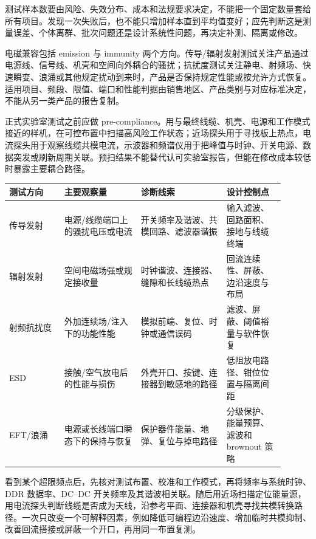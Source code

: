 测试样本数要由风险、失效分布、成本和法规要求决定，不能把一个固定数量套给所有项目。发现一次失败后，也不能只增加样本直到平均值变好；应先判断这是测量误差、个体离群、批次问题还是设计系统性问题，再决定补测、隔离或修改。


电磁兼容包括 emission 与 immunity 两个方向。传导/辐射发射测试关注产品通过电源线、信号线、机壳和空间向外耦合的骚扰；抗扰度测试关注静电、射频场、快速瞬变、浪涌或其他规定扰动到来时，产品是否保持规定性能或按允许方式恢复。适用项目、频段、限值、端口和性能判据由销售地区、产品类别与对应标准决定，不能从另一类产品的报告复制。\cite{iec-emc}

正式实验室测试之前应做 pre-compliance。用与最终线缆、机壳、电源和工作模式接近的样机，在可控布置中扫描高风险工作状态；近场探头用于寻找板上热点，电流探头用于观察线缆共模电流，示波器和频谱仪用于把峰值与时钟、开关电源、数据突发或刷新周期关联。预扫结果不能替代认可实验室报告，但能在修改成本较低时暴露主要耦合路径。

\begin{longtable}{L{0.18\linewidth}L{0.25\linewidth}L{0.28\linewidth}L{0.19\linewidth}}
\toprule
测试方向 & 主要观察量 & 诊断线索 & 设计控制点 \\
\midrule
传导发射 & 电源/线缆端口上的骚扰电压或电流 & 开关频率及谐波、共模回路、滤波器谐振 & 输入滤波、回路面积、接地与线缆终端 \\\tablerowrule
辐射发射 & 空间电磁场强或规定接收量 & 时钟谐波、连接器、缝隙和长线缆热点 & 回流连续性、屏蔽、边沿速度与布局 \\\tablerowrule
射频抗扰度 & 外加连续场/注入下的功能性能 & 模拟前端、复位、时钟或通信误码 & 滤波、屏蔽、阈值裕量与软件恢复 \\\tablerowrule
ESD & 接触/空气放电后的性能与损伤 & 外壳开口、按键、连接器到敏感地的路径 & 低阻放电路径、钳位位置与隔离间距 \\\tablerowrule
EFT/浪涌 & 电源或长线端口瞬态下的保持与恢复 & 保护器件能量、地弹、复位与掉电路径 & 分级保护、能量预算、滤波和 brownout 策略 \\
\bottomrule
\end{longtable}


看到某个超限频点后，先核对测试布置、校准和工作模式，再将频率与系统时钟、DDR 数据率、DC--DC 开关频率及其谐波相关联。随后用近场扫描定位能量源，用电流探头判断线缆是否成为天线，沿参考平面、连接器和机壳寻找共模转换路径。一次只改变一个可解释因素，例如降低可编程边沿速度、增加临时共模抑制、改善回流搭接或屏蔽一个开口，再用同一布置复测。

